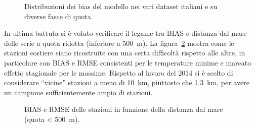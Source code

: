 \begin{figure}[ht]
  \centering
  
  \caption{Distribuzioni dei bias del modello nei vari dataset italiani e su diverse fasce di quota.}\label{fig:boxplots-ita}
\end{figure}

In ultima battuta si è voluto verificare il legame tra BIAS e distanza dal mare delle serie a quota ridotta (inferiore a \qty{500}{\meter}). La figura~\ref{fig:sea-bias} mostra come le stazioni costiere siano ricostruite con una certa difficoltà rispetto alle altre, in particolare con BIAS e RMSE consistenti per le temperature minime e marcato effetto stagionale per le massime. Rispetto al lavoro del 2014 si è scelto di considerare ``vicine'' stazioni a meno di \qty{10}{\kilo\meter}, piuttosto che \qty{1.3}{\kilo\meter}, per avere un campione sufficientemente ampio di stazioni.

\begin{figure}[ht]
  \centering
  
  \caption{BIAS e RMSE delle stazioni in funzione della distanza dal mare (quota < \qty{500}{\meter}).}\label{fig:sea-bias}
\end{figure}

